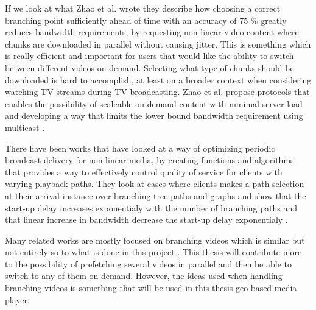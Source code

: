 If we look at what Zhao et al. \cite{scalableOnDemand} wrote they describe how choosing a correct branching point sufficiently ahead of time with an accuracy of 75 \% greatly reduces bandwidth requirements, by requesting non-linear video content where chunks are downloaded in parallel without causing jitter. This is something which is really efficient and important for users that would like the ability to switch between different videos on-demand. Selecting what type of chunks should be downloaded is hard to accomplish, at least on a broader context when considering watching TV-streams during TV-broadcasting. Zhao et al. \cite{scalableOnDemand} propose protocols that enables the possibility of scaleable on-demand content with minimal server load and developing a way that limits the lower bound bandwidth requirement using multicast \cite{scalableOnDemand}. 


There have been works that have looked at a way of optimizing periodic broadcast delivery for non-linear media, by creating functions and algorithms that provides a way to effectively control quality of service for clients with varying playback paths. They look at cases where clients makes a path selection at their arrival instance over branching tree paths and graphs and show that the start-up delay increases exponentialy with the number of branching paths and that linear increase in bandwidth decrease the start-up delay exponentialy \cite{optimizedbroadcast}.

Many related works are mostly focused on branching videos which is similar but not entirely so to what is done in this project \cite{hasmultipath, qualbranch, scalableOnDemand}. This thesis will contribute more to the possibility of prefetching several videos in parallel and then be able to switch to any of them on-demand. However, the ideas used when handling branching videos is something that will be used in this thesis geo-based media player.

